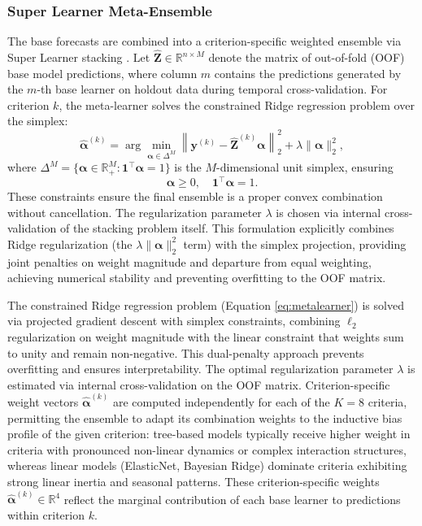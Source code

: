 \documentclass[12pt,a4paper]{article}
\begin{document}
\subsubsection{Super Learner Meta-Ensemble}

The base forecasts are combined into a criterion-specific weighted ensemble via Super Learner stacking \citep{vanDerLaan2007}. Let $\widehat{\mathbf{Z}} \in \mathbb{R}^{n \times M}$ denote the matrix of out-of-fold (OOF) base model predictions, where column $m$ contains the predictions generated by the $m$-th base learner on holdout data during temporal cross-validation. For criterion $k$, the meta-learner solves the constrained Ridge regression problem over the simplex:
\begin{equation}
\label{eq:metalearner}
\widehat{\boldsymbol{\alpha}}^{(k)} = \arg\min_{\boldsymbol{\alpha} \in \Delta^M} \left\lVert \mathbf{y}^{(k)} - \widehat{\mathbf{Z}}^{(k)} \boldsymbol{\alpha} \right\rVert_2^2 + \lambda \lVert \boldsymbol{\alpha} \rVert_2^2,
\end{equation}
where $\Delta^M = \{\boldsymbol{\alpha} \in \mathbb{R}^M_+ : \mathbf{1}^\top \boldsymbol{\alpha} = 1\}$ is the $M$-dimensional unit simplex, ensuring
\begin{equation}
\boldsymbol{\alpha} \ge 0, \quad \mathbf{1}^\top \boldsymbol{\alpha} = 1.
\end{equation}
These constraints ensure the final ensemble is a proper convex combination without cancellation. The regularization parameter $\lambda$ is chosen via internal cross-validation of the stacking problem itself. This formulation explicitly combines Ridge regularization (the $\lambda \lVert \boldsymbol{\alpha} \rVert_2^2$ term) with the simplex projection, providing joint penalties on weight magnitude and departure from equal weighting, achieving numerical stability and preventing overfitting to the OOF matrix.

The constrained Ridge regression problem (Equation \ref{eq:metalearner}) is solved via projected gradient descent with simplex constraints, combining $\ell_2$ regularization on weight magnitude with the linear constraint that weights sum to unity and remain non-negative. This dual-penalty approach prevents overfitting and ensures interpretability. The optimal regularization parameter $\lambda$ is estimated via internal cross-validation on the OOF matrix. Criterion-specific weight vectors $\widehat{\boldsymbol{\alpha}}^{(k)}$ are computed independently for each of the $K=8$ criteria, permitting the ensemble to adapt its combination weights to the inductive bias profile of the given criterion: tree-based models typically receive higher weight in criteria with pronounced non-linear dynamics or complex interaction structures, whereas linear models (ElasticNet, Bayesian Ridge) dominate criteria exhibiting strong linear inertia and seasonal patterns. These criterion-specific weights $\widehat{\boldsymbol{\alpha}}^{(k)} \in \mathbb{R}^4$ reflect the marginal contribution of each base learner to predictions within criterion $k$.
\end{document}
